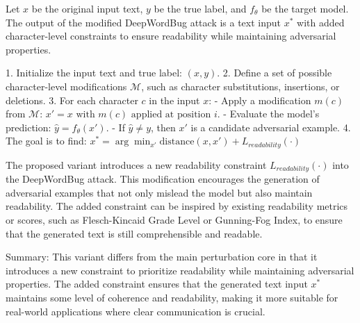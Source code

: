 Let \( x \) be the original input text, \( y \) be the true label, and \( f_{\theta} \) be the target model.
The output of the modified DeepWordBug attack is a text input \( x^* \) with added character-level constraints to ensure readability while maintaining adversarial properties.

1. Initialize the input text and true label:
$
(x, y).
$
2. Define a set of possible character-level modifications \( \mathcal{M} \), such as character substitutions, insertions, or deletions.
3. For each character \( c \) in the input \( x \):
   - Apply a modification \( m(c) \) from \( \mathcal{M} \):
   $
   x' = x \text{ with } m(c) \text{ applied at position } i.
   $
   - Evaluate the model's prediction:
   $
   \hat{y} = f_{\theta}(x').
   $
   - If \( \hat{y} \neq y \), then \( x' \) is a candidate adversarial example.
4. The goal is to find:
   $
   x^* = \arg\min_{x'} \text{distance}(x, x') + L_{readability}(\cdot)
   $

The proposed variant introduces a new readability constraint \( L_{readability}(\cdot) \) into the DeepWordBug attack. This modification encourages the generation of adversarial examples that not only mislead the model but also maintain readability. The added constraint can be inspired by existing readability metrics or scores, such as Flesch-Kincaid Grade Level or Gunning-Fog Index, to ensure that the generated text is still comprehensible and readable.

Summary: This variant differs from the main perturbation core in that it introduces a new constraint to prioritize readability while maintaining adversarial properties. The added constraint ensures that the generated text input \( x^* \) maintains some level of coherence and readability, making it more suitable for real-world applications where clear communication is crucial.